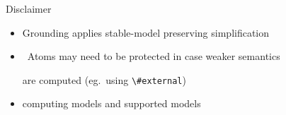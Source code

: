 \begin{frame}{Disclaimer}
  \bigskip
  \begin{itemize}
  \item Grounding applies stable-model preserving simplification
  \item [] \itarrow\ Atoms may need to be protected in case weaker semantics
    \par\phantom{\itarrow}
    are computed
    (eg.\ using \lstinline{\#external})
    \medskip
  \item {} computing models and supported models
  \end{itemize}
\end{frame}
%
